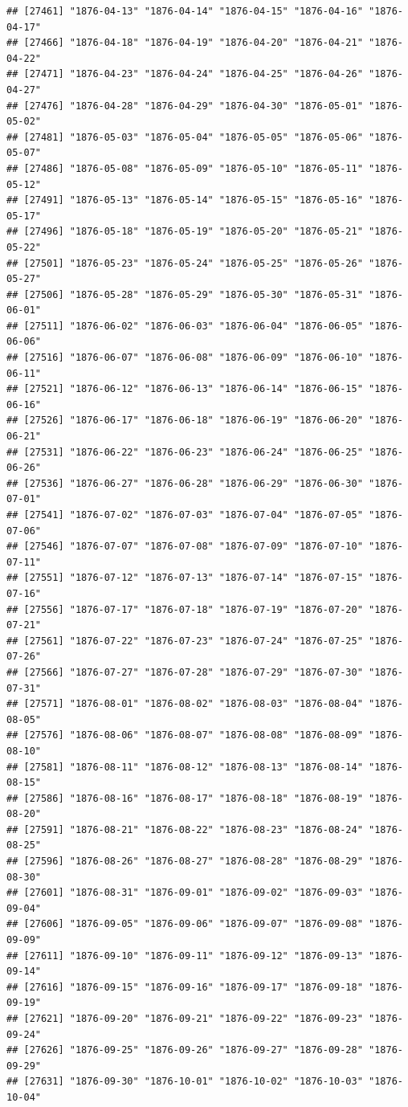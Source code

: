 \documentclass{article}\usepackage[]{graphicx}\usepackage[]{color}
\makeatletter
\newenvironment{kframe}{%
 \def\at@end@of@kframe{}%
 \ifinner\ifhmode%
  \def\at@end@of@kframe{\end{minipage}}%
  \begin{minipage}{\columnwidth}%
 \fi\fi%
 \def\FrameCommand##1{\hskip\@totalleftmargin \hskip-\fboxsep
 \colorbox{shadecolor}{##1}\hskip-\fboxsep
     \hskip-\linewidth \hskip-\@totalleftmargin \hskip\columnwidth}%
 \MakeFramed {\advance\hsize-\width
   \@totalleftmargin\z@ \linewidth\hsize
   \@setminipage}}%
 {\par\unskip\endMakeFramed%
 \at@end@of@kframe}
\newenvironment{knitrout}{}{} %
\makeatother
\begin{document}
\begin{description}
\begin{knitrout}
\begin{kframe}
\begin{verbatim}
## [27461] "1876-04-13" "1876-04-14" "1876-04-15" "1876-04-16" "1876-04-17"
## [27466] "1876-04-18" "1876-04-19" "1876-04-20" "1876-04-21" "1876-04-22"
## [27471] "1876-04-23" "1876-04-24" "1876-04-25" "1876-04-26" "1876-04-27"
## [27476] "1876-04-28" "1876-04-29" "1876-04-30" "1876-05-01" "1876-05-02"
## [27481] "1876-05-03" "1876-05-04" "1876-05-05" "1876-05-06" "1876-05-07"
## [27486] "1876-05-08" "1876-05-09" "1876-05-10" "1876-05-11" "1876-05-12"
## [27491] "1876-05-13" "1876-05-14" "1876-05-15" "1876-05-16" "1876-05-17"
## [27496] "1876-05-18" "1876-05-19" "1876-05-20" "1876-05-21" "1876-05-22"
## [27501] "1876-05-23" "1876-05-24" "1876-05-25" "1876-05-26" "1876-05-27"
## [27506] "1876-05-28" "1876-05-29" "1876-05-30" "1876-05-31" "1876-06-01"
## [27511] "1876-06-02" "1876-06-03" "1876-06-04" "1876-06-05" "1876-06-06"
## [27516] "1876-06-07" "1876-06-08" "1876-06-09" "1876-06-10" "1876-06-11"
## [27521] "1876-06-12" "1876-06-13" "1876-06-14" "1876-06-15" "1876-06-16"
## [27526] "1876-06-17" "1876-06-18" "1876-06-19" "1876-06-20" "1876-06-21"
## [27531] "1876-06-22" "1876-06-23" "1876-06-24" "1876-06-25" "1876-06-26"
## [27536] "1876-06-27" "1876-06-28" "1876-06-29" "1876-06-30" "1876-07-01"
## [27541] "1876-07-02" "1876-07-03" "1876-07-04" "1876-07-05" "1876-07-06"
## [27546] "1876-07-07" "1876-07-08" "1876-07-09" "1876-07-10" "1876-07-11"
## [27551] "1876-07-12" "1876-07-13" "1876-07-14" "1876-07-15" "1876-07-16"
## [27556] "1876-07-17" "1876-07-18" "1876-07-19" "1876-07-20" "1876-07-21"
## [27561] "1876-07-22" "1876-07-23" "1876-07-24" "1876-07-25" "1876-07-26"
## [27566] "1876-07-27" "1876-07-28" "1876-07-29" "1876-07-30" "1876-07-31"
## [27571] "1876-08-01" "1876-08-02" "1876-08-03" "1876-08-04" "1876-08-05"
## [27576] "1876-08-06" "1876-08-07" "1876-08-08" "1876-08-09" "1876-08-10"
## [27581] "1876-08-11" "1876-08-12" "1876-08-13" "1876-08-14" "1876-08-15"
## [27586] "1876-08-16" "1876-08-17" "1876-08-18" "1876-08-19" "1876-08-20"
## [27591] "1876-08-21" "1876-08-22" "1876-08-23" "1876-08-24" "1876-08-25"
## [27596] "1876-08-26" "1876-08-27" "1876-08-28" "1876-08-29" "1876-08-30"
## [27601] "1876-08-31" "1876-09-01" "1876-09-02" "1876-09-03" "1876-09-04"
## [27606] "1876-09-05" "1876-09-06" "1876-09-07" "1876-09-08" "1876-09-09"
## [27611] "1876-09-10" "1876-09-11" "1876-09-12" "1876-09-13" "1876-09-14"
## [27616] "1876-09-15" "1876-09-16" "1876-09-17" "1876-09-18" "1876-09-19"
## [27621] "1876-09-20" "1876-09-21" "1876-09-22" "1876-09-23" "1876-09-24"
## [27626] "1876-09-25" "1876-09-26" "1876-09-27" "1876-09-28" "1876-09-29"
## [27631] "1876-09-30" "1876-10-01" "1876-10-02" "1876-10-03" "1876-10-04"

\end{verbatim}
\end{kframe}
\end{knitrout}
\end{description}
\end{document}

